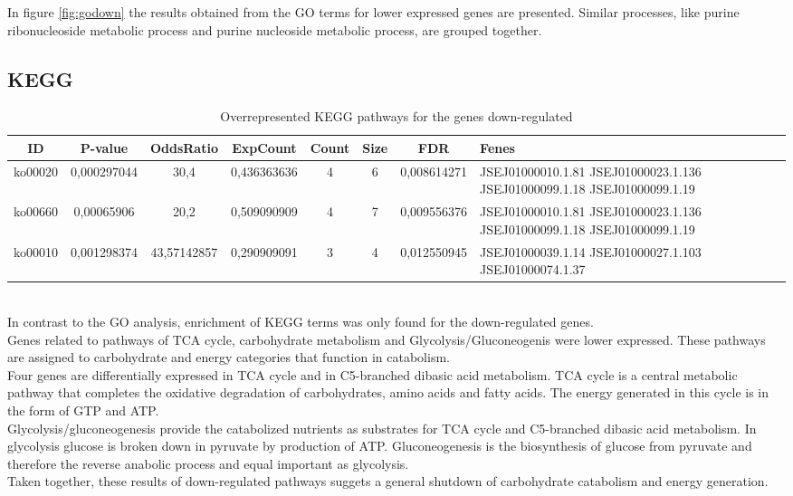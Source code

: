 \documentclass[12pt, a4paper]{report}
\begin{document}
In figure \ref{fig:godown} the results obtained from the GO terms for lower expressed genes are presented. Similar processes, like purine ribonucleoside metabolic process and purine nucleoside metabolic process, are grouped together. 


\subsection{KEGG}

\begin{table}[H]
	\centering
	\tiny
	\begin{tabular}{c|c|c|c|c|c|c|p{2cm}}
		\textbf{ID}&\textbf{P-value}&\textbf{OddsRatio}&\textbf{ExpCount}&\textbf{Count}&\textbf{Size}& \textbf{FDR}&\textbf{Fenes}\\
		\hline
ko00020&	0,000297044&	30,4&	0,436363636	&4	&6&	0,008614271	&JSEJ01000010.1.81 JSEJ01000023.1.136 JSEJ01000099.1.18 JSEJ01000099.1.19\\
\hline
ko00660&	0,00065906&	20,2&	0,509090909&	4&	7&	0,009556376	&JSEJ01000010.1.81 JSEJ01000023.1.136 JSEJ01000099.1.18 JSEJ01000099.1.19\\
\hline
ko00010&	0,001298374&	43,57142857&	0,290909091&	3&	4&	0,012550945&JSEJ01000039.1.14 JSEJ01000027.1.103 JSEJ01000074.1.37\\
		\hline
	\end{tabular}
	\caption{Overrepresented KEGG pathways for the genes down-regulated}
\end{table}
\ \\
In contrast to the GO analysis, enrichment of KEGG terms was only found for the down-regulated genes. \\
Genes related to pathways of TCA cycle, carbohydrate metabolism and Glycolysis/Gluconeogenis were lower expressed. These pathways are assigned to carbohydrate and energy categories that function in catabolism.\\
Four genes are differentially expressed in TCA cycle and in C5-branched dibasic acid metabolism. TCA cycle is a central metabolic pathway that completes the oxidative degradation of carbohydrates, amino acids and fatty acids. The energy generated in this cycle is in the form of GTP and ATP. \\
Glycolysis/gluconeogenesis provide the catabolized nutrients as substrates for TCA cycle and C5-branched dibasic acid metabolism. In glycolysis glucose is broken down in pyruvate by production of ATP. Gluconeogenesis is the biosynthesis of glucose from pyruvate and therefore the reverse anabolic process and equal important as glycolysis. \\
Taken together, these results of down-regulated pathways suggets a general shutdown of carbohydrate catabolism and energy generation.
\end{document}
